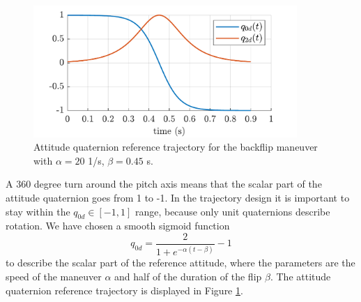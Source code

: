 \begin{figure}
    \centering
    \includegraphics[width=10cm]{Fig/quat_ref.pdf}
    \caption{Attitude quaternion reference trajectory for the backflip maneuver with $\alpha=20$ 1/s, $\beta = 0.45$ s.}
    \label{fig:attref}
\end{figure}

A 360 degree turn around the pitch axis means that the scalar part of the attitude quaternion goes from 1 to -1. In the trajectory design it is important to stay within the $q_{0d}\in [-1, 1]$ range, because only unit quaternions describe rotation. We have chosen a smooth sigmoid function
\begin{equation}\label{eq:sigmoid}
    q_{0d} = \frac{2}{1+e^{-\alpha(t-\beta)}}-1
\end{equation}
to describe the scalar part of the reference attitude, where the parameters are the speed of the maneuver $\alpha$ and half of the duration of the flip $\beta$. The attitude quaternion reference trajectory is displayed in Figure \ref{fig:attref}.

